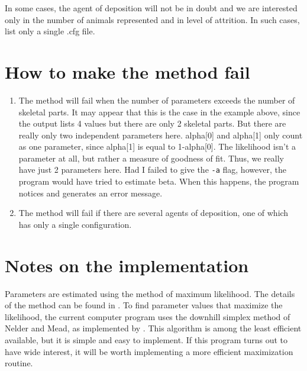 In some cases, the agent of deposition will not be in doubt and we are
interested only in the number of animals represented and in level of
attrition.  In such cases, list only a single .cfg file.

\section{How to make the method fail}

\begin{enumerate}
\item
The method will fail when the number of parameters exceeds the number
of skeletal parts.  It may appear that this is the case in the example
above, since the output lists 4 values but there are only 2 skeletal
parts.  But there are really only two independent parameters here.
alpha[0] and alpha[1] only count as one parameter, since alpha[1] is
equal to 1-alpha[0].  The likelihood isn't a parameter at all, but
rather a measure of goodness of fit.  Thus, we really have just 2
parameters here.  Had I failed to give the \texttt{-a} flag, however, the
program would have tried to estimate beta.  When this happens, the program
notices and generates an error message.

\item
The method will fail if there are several agents of deposition, one of
which has only a single configuration.
\end{enumerate}

\section{Notes on the implementation}

Parameters are estimated using the method of maximum likelihood.  The details
of the method can be found in \citet{Rogers:JAS-27-111}.  To find parameter
values that maximize the likelihood, the current computer program uses the
downhill simplex method of Nelder and Mead, as implemented by
\citet{Press:NRC-92}.  This algorithm is among the least efficient available,
but it is simple and easy to implement.  If this program turns out to have
wide interest, it will be worth implementing a more efficient maximization
routine.
  

